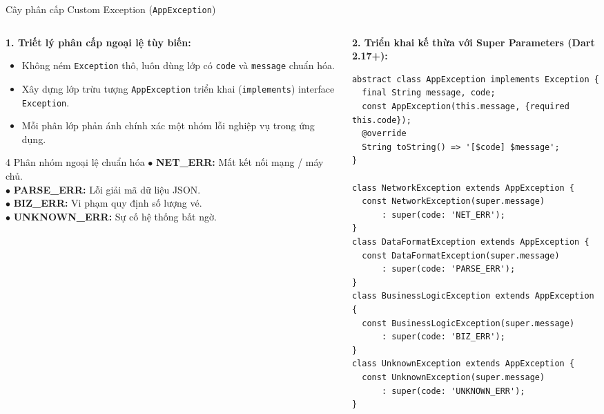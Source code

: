 \documentclass[aspectratio=169, 10pt]{beamer}
\begin{document}
\begin{frame}[fragile]{Cây phân cấp Custom Exception (\texttt{AppException})}
  \vspace{-0.35cm}
  \begin{columns}[t,onlytextwidth]
    \begin{column}{0.48\textwidth}
      \textbf{1. Triết lý phân cấp ngoại lệ tùy biến:}
      \begin{itemize}
        \item Không ném \texttt{Exception} thô, luôn dùng lớp có \texttt{code} và \texttt{message} chuẩn hóa.
        \item Xây dựng lớp trừu tượng \texttt{AppException} triển khai (\texttt{implements}) interface \texttt{Exception}.
        \item Mỗi phân lớp phản ánh chính xác một nhóm lỗi nghiệp vụ trong ứng dụng.
      \end{itemize}

      \vspace{0.05cm}
      \begin{block}{\scriptsize 4 Phân nhóm ngoại lệ chuẩn hóa}
        \tiny
        $\bullet$ \textbf{NET\_ERR:} Mất kết nối mạng / máy chủ.\\
        $\bullet$ \textbf{PARSE\_ERR:} Lỗi giải mã dữ liệu JSON.\\
        $\bullet$ \textbf{BIZ\_ERR:} Vi phạm quy định số lượng vé.\\
        $\bullet$ \textbf{UNKNOWN\_ERR:} Sự cố hệ thống bất ngờ.
      \end{block}
    \end{column}

    \begin{column}{0.50\textwidth}
      \textbf{2. Triển khai kế thừa với Super Parameters (Dart 2.17+):}
      \begin{lstlisting}[basicstyle=\ttfamily\tiny\color{black}, columns=flexible]
abstract class AppException implements Exception {
  final String message, code;
  const AppException(this.message, {required this.code});
  @override
  String toString() => '[$code] $message';
}

class NetworkException extends AppException {
  const NetworkException(super.message)
      : super(code: 'NET_ERR');
}
class DataFormatException extends AppException {
  const DataFormatException(super.message)
      : super(code: 'PARSE_ERR');
}
class BusinessLogicException extends AppException {
  const BusinessLogicException(super.message)
      : super(code: 'BIZ_ERR');
}
class UnknownException extends AppException {
  const UnknownException(super.message)
      : super(code: 'UNKNOWN_ERR');
}
      \end{lstlisting}
    \end{column}
  \end{columns}
\end{frame}
\end{document}
